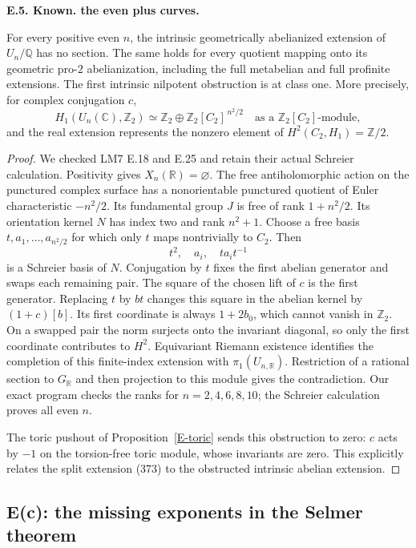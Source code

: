 \documentclass[11pt,oneside]{article}
\makeatletter
\newcounter{statementanchor}
\newenvironment{statement}[3]{%
 \refstepcounter{statementanchor}\def\@currentlabel{#1}%
 \par\addvspace{9pt}\noindent
 \textbf{#1. #2. #3.}\par\nobreak\noindent\ignorespaces
}{\par\addvspace{5pt}}
\makeatother
\begin{document}
\begin{statement}{E.5}{Known}{the even plus curves}
\label{st:E.5}
\label{E-even}
For every positive even $n$, the intrinsic geometrically
abelianized extension of $U_n/\mathbb Q$ has no section.
The same holds for every quotient mapping onto its
geometric pro-$2$ abelianization, including the full
metabelian and full profinite extensions. The first
intrinsic nilpotent obstruction is at class one.
More precisely, for complex conjugation $c$,
\[
 H_1(U_n(\mathbb C),\mathbb Z_2)
 \simeq\mathbb Z_2\oplus
       \mathbb Z_2[C_2]^{\,n^2/2}
 \quad\text{as a }\mathbb Z_2[C_2]\text{-module},
\]
and the real extension represents the nonzero element
of $H^2(C_2,H_1)=\mathbb Z/2$.
\end{statement}
\begin{proof}
We checked LM7 E.18 and E.25 and retain their actual
Schreier calculation. Positivity gives $X_n(\mathbb R)=\varnothing$.
The free antiholomorphic action on the punctured complex
surface has a nonorientable punctured quotient of Euler
characteristic $-n^2/2$. Its fundamental group $J$ is
free of rank $1+n^2/2$. Its orientation kernel $N$
has index two and rank $n^2+1$. Choose a free basis
$t,a_1,\dots,a_{n^2/2}$ for which only $t$ maps
nontrivially to $C_2$. Then
\[
 t^2,\quad a_i,\quad t a_i t^{-1}
\]
is a Schreier basis of $N$. Conjugation by $t$ fixes
the first abelian generator and swaps each remaining
pair. The square of the chosen lift of $c$ is the
first generator. Replacing $t$ by $bt$ changes this
square in the abelian kernel by $(1+c)[b]$.
Its first coordinate is always $1+2b_0$, which cannot
vanish in $\mathbb Z_2$. On a swapped pair the norm
surjects onto the invariant diagonal, so only the
first coordinate contributes to $H^2$.
Equivariant Riemann existence identifies the completion
of this finite-index extension with $\pi_1(U_{n,\mathbb R})$.
Restriction of a rational section to $G_{\mathbb R}$
and then projection to this module gives the contradiction.
Our exact program checks the ranks for $n=2,4,6,8,10$;
the Schreier calculation proves all even $n$.

The toric pushout of Proposition~\ref{E-toric} sends
this obstruction to zero: $c$ acts by $-1$ on the
torsion-free toric module, whose invariants are zero.
This explicitly relates the split extension (373)
to the obstructed intrinsic abelian extension.
\end{proof}

\subsection{E(c): the missing exponents in the Selmer theorem}
\end{document}
